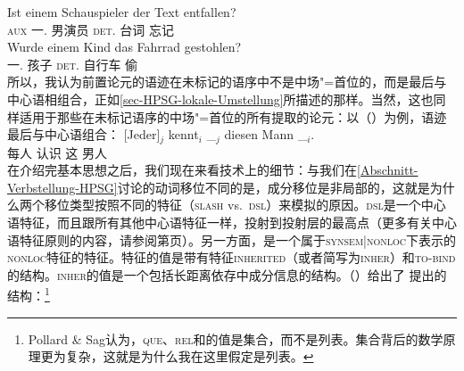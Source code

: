 \ex 
\gll Ist einem Schauspieler der Text entfallen?\\
      \textsc{aux}  一.\dat{} 男演员     \textsc{det}.\nom{} 台词 忘记\\
\ex
\gll Wurde einem Kind das Fahrrad gestohlen?\\
     \passivepst{} 一.\dat{} 孩子 \textsc{det}.\nom{} 自行车 偷\\
\zl
所以，我认为前置论元的语迹在未标记的语序中不是中场"=首位的，而是最后与中心语相组合，正如\ref{sec-HPSG-lokale-Umstellung}所描述的那样。当然，这也同样适用于那些在未标记语序的中场"=首位的所有提取的论元：以（）为例，语迹最后与中心语组合：
\ea
\label{Beispiel-jeder-kennt-diesen-Mann-HPSG}
\gll {}[Jeder]$_j$ kennt$_i$ \_$_j$ diesen Mann \_$_i$.\\
	 {}\spacebr{}每人 认识 {} 这 男人\\
\z
在介绍完基本思想之后，我们现在来看技术上的细节：与我们在\ref{Abschnitt-Verbstellung-HPSG}讨论的动词移位不同的是，成分移位是非局部的，这就是为什么两个移位类型按照不同的特征（\textsc{slash} vs.\ \textsc{dsl}）来模拟的原因。\textsc{dsl}是一个中心语特征，而且跟所有其他中心语特征一样，投射到投射层的最高点（更多有关中心语特征原则的内容，请参阅第\pageref{prinzip-hfp}页）。另一方面，\slaschc 是一个属于\textsc{synsem|nonloc}下表示的\textsc{nonloc}特征的特征。\nonlocc 特征的值是带有特征\textsc{inherited}（或者简写为\textsc{inher}）和\textsc{to-bind}的结构。\textsc{inher}的值是一个包括长距离依存中成分信息的结构。（）给出了 \citet[]{ps2}提出的结构：\footnote{%
Pollard \& Sag认为，\textsc{que}、\textsc{rel}和\slaschc 的值是集合，而不是列表。集合背后的数学原理更为复杂，这就是为什么我在这里假定是列表。
}
